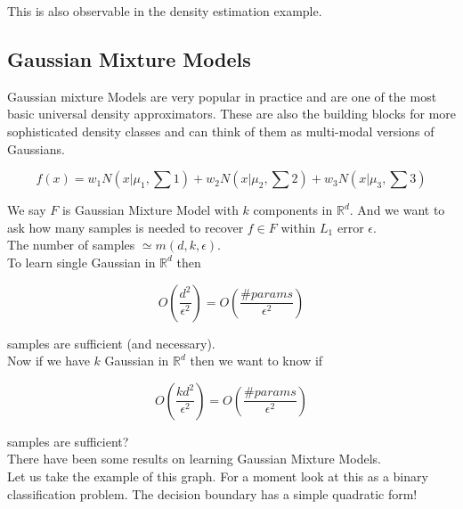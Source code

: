 \documentclass{article}
\begin{document}
\noindent This is also observable in the density estimation example.

\subsection{Gaussian Mixture Models}

Gaussian mixture Models are very popular in practice and are one of the most basic universal density approximators. These are also the building blocks for more sophisticated density classes and can think of them as multi-modal versions of Gaussians.

\begin{equation*}
    f(x) = w_1N(x|\mu_1,\sum 1)+w_2N(x|\mu_2,\sum 2)+w_3N(x|\mu_3,\sum 3)
\end{equation*}

\noindent We say $F$ is Gaussian Mixture Model with $k$ components in $\mathbb{R}^d$. And we want to ask how many samples is needed to recover $f \in F$ within $L_1$ error $\epsilon$.\\

\noindent The number of samples $\simeq m(d,k,\epsilon)$.\\

\noindent To learn single Gaussian in $\mathbb{R}^d$ then

\begin{equation*}
    O \left( \frac{d^2}{\epsilon^2} \right) = O \left( \frac{\# params}{\epsilon^2} \right)
\end{equation*}

\noindent samples are sufficient (and necessary).\\

\noindent Now if we have $k$ Gaussian in $\mathbb{R}^d$ then we want to know if 

\begin{equation*}
    O \left( \frac{kd^2}{\epsilon^2} \right) = O \left( \frac{\# params}{\epsilon^2} \right)
\end{equation*}

\noindent samples are sufficient?\\

\noindent There have been some results on learning Gaussian Mixture Models.\\

\noindent Let us take the example of this graph. For a moment look at this as a binary classification problem. The decision boundary has a simple quadratic form!
\end{document}
